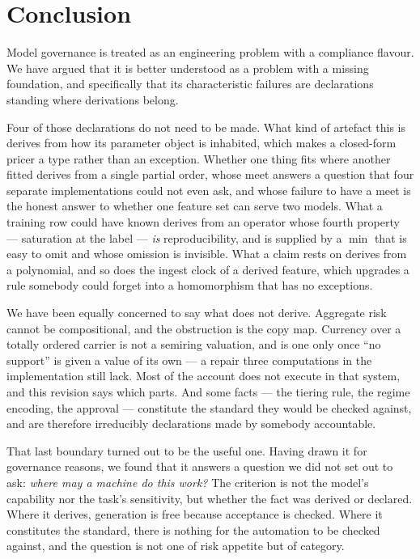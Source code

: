 \documentclass[11pt,a4paper]{article}
\renewcommand{\_}{\oldunderscore\allowbreak}
\theoremstyle{plain}
\theoremstyle{definition}
\theoremstyle{definition}
\theoremstyle{remark}
\begin{document}
\section{Conclusion}\label{sec:conclusion}

Model governance is treated as an engineering problem with a compliance flavour. We have argued that it is
better understood as a problem with a missing foundation, and specifically that its characteristic failures
are declarations standing where derivations belong.

Four of those declarations do not need to be made. What kind of artefact this is derives from how its
parameter object is inhabited, which makes a closed-form pricer a type rather than an exception. Whether one
thing fits where another fitted derives from a single partial order, whose meet answers a question that four
separate implementations could not even ask, and whose failure to have a meet is the honest answer to
whether one feature set can serve two models. What a training row could have known derives from an operator
whose fourth property --- saturation at the label --- \emph{is} reproducibility, and is supplied by a $\min$
that is easy to omit and whose omission is invisible. What a claim rests on derives from a polynomial, and
so does the ingest clock of a derived feature, which upgrades a rule somebody could forget into a
homomorphism that has no exceptions.

We have been equally concerned to say what does not derive. Aggregate risk cannot be compositional, and the
obstruction is the copy map. Currency over a totally ordered carrier is not a semiring valuation, and is
one only once ``no support'' is given a value of its own --- a repair three computations in the
implementation still lack. Most of the account does not execute in that system, and this revision says which
parts. And some facts --- the tiering rule, the regime encoding, the
approval --- constitute the standard they would be checked against, and are therefore irreducibly
declarations made by somebody accountable.

That last boundary turned out to be the useful one. Having drawn it for governance reasons, we found that it
answers a question we did not set out to ask: \emph{where may a machine do this work?} The criterion is not
the model's capability nor the task's sensitivity, but whether the fact was derived or declared. Where it
derives, generation is free because acceptance is checked. Where it constitutes the standard, there is
nothing for the automation to be checked against, and the question is not one of risk appetite but of
category.
\end{document}
